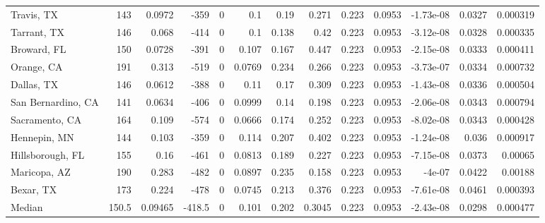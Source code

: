 \documentclass[12pt,letterpaper]{article}
\begin{document}
\begin{appendices}
\begin{sidewaystable}
{\begin{tabular}{lrrrrrrrrrrrr}
 Travis, TX         & 143   & 0.0972  & -359   &     0 &          0.1    &            0.19  &         0.271  &        0.223 &       0.0953 &        -1.73e-08 &           0.0327  &        0.000319 \\
 Tarrant, TX        & 146   & 0.068   & -414   &     0 &          0.1    &            0.138 &         0.42   &        0.223 &       0.0953 &        -3.12e-08 &           0.0328  &        0.000335 \\
 Broward, FL        & 150   & 0.0728  & -391   &     0 &          0.107  &            0.167 &         0.447  &        0.223 &       0.0953 &        -2.15e-08 &           0.0333  &        0.000411 \\
 Orange, CA         & 191   & 0.313   & -519   &     0 &          0.0769 &            0.234 &         0.266  &        0.223 &       0.0953 &        -3.73e-07 &           0.0334  &        0.000732 \\
 Dallas, TX         & 146   & 0.0612  & -388   &     0 &          0.11   &            0.17  &         0.309  &        0.223 &       0.0953 &        -1.43e-08 &           0.0336  &        0.000504 \\
 San Bernardino, CA & 141   & 0.0634  & -406   &     0 &          0.0999 &            0.14  &         0.198  &        0.223 &       0.0953 &        -2.06e-08 &           0.0343  &        0.000794 \\
 Sacramento, CA     & 164   & 0.109   & -574   &     0 &          0.0666 &            0.174 &         0.252  &        0.223 &       0.0953 &        -8.02e-08 &           0.0343  &        0.000428 \\
 Hennepin, MN       & 144   & 0.103   & -359   &     0 &          0.114  &            0.207 &         0.402  &        0.223 &       0.0953 &        -1.24e-08 &           0.036   &        0.000917 \\
 Hillsborough, FL   & 155   & 0.16    & -461   &     0 &          0.0813 &            0.189 &         0.227  &        0.223 &       0.0953 &        -7.15e-08 &           0.0373  &        0.00065  \\
 Maricopa, AZ       & 190   & 0.283   & -482   &     0 &          0.0897 &            0.235 &         0.158  &        0.223 &       0.0953 &        -4e-07    &           0.0422  &        0.00188  \\
 Bexar, TX          & 173   & 0.224   & -478   &     0 &          0.0745 &            0.213 &         0.376  &        0.223 &       0.0953 &        -7.61e-08 &           0.0461  &        0.000393 \\
\hline
 Median             & 150.5 & 0.09465 & -418.5 &     0 &          0.101  &            0.202 &         0.3045 &        0.223 &       0.0953 &        -2.43e-08 &           0.0298  &        0.000477 \\
\hline
\end{tabular}


}
\end{sidewaystable}
\end{appendices}
\end{document}
